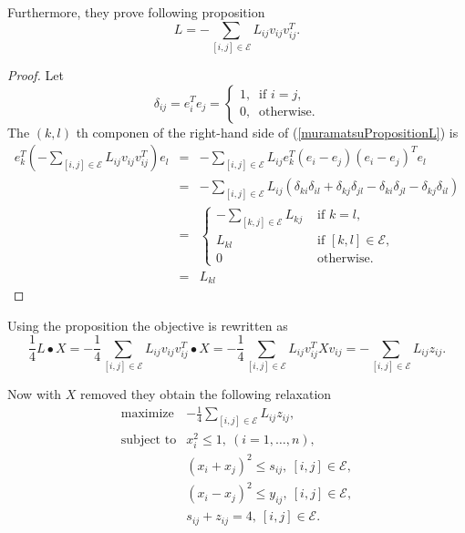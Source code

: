 \documentclass[12pt]{book}
\theoremstyle{definition}
\begin{document}
Furthermore, they prove following proposition
\prop \begin{equation}
\label{muramatsuPropositionL}
L = - \sum_{[i,j]\in \mathcal{E}} L_{ij}v_{ij}v_{ij}^T.
\end{equation}
\rm
\begin{proof}
 Let $$\delta_{ij} = e_i^Te_j = \left\lbrace \begin{array}{l}
1, \ \mbox{ if } i = j, \\
0, \ \mbox{ otherwise}.
\end{array}\right.$$
The $(k,l)$ th componen of the right-hand side of (\ref{muramatsuPropositionL}) is 
\begin{eqnarray*}
e_k^T\left(- \sum_{[i,j]\in \mathcal{E}} L_{ij}v_{ij}v_{ij}^T \right) e_l &=& - \sum_{[i,j]\in \mathcal{E}} L_{ij}e_k^T(e_i-e_j)(e_i-e_j)^Te_l \\
&=& - \sum_{[i,j]\in \mathcal{E}} L_{ij}(\delta_{ki}\delta_{il} + \delta_{kj}\delta_{jl} -  \delta_{ki}\delta_{jl} - \delta_{kj}\delta_{il}) \\
&=& \left\lbrace \begin{array}{ll}
- \sum_{[k,j]\in \mathcal{E}}L_{kj} & \mbox{ if } k = l ,\\
L_{kl} & \mbox{ if } [k,l]\in\mathcal{E}, \\
0 & \mbox{ otherwise.}
\end{array}\right. \\
&=& L_{kl}
\end{eqnarray*}
\end{proof}

Using the proposition the objective is rewritten as 
\begin{equation}
\frac{1}{4}L\bullet X = -\frac{1}{4}\sum_{[i,j]\in \mathcal{E}} L_{ij}v_{ij}v_{ij}^T\bullet X = -\frac{1}{4} \sum_{[i,j]\in \mathcal{E}} L_{ij}v_{ij}^TXv_{ij} = - \sum_{[i,j]\in \mathcal{E}} L_{ij}z_{ij}.
\end{equation}

Now with $X$ removed they obtain the following relaxation 
\begin{equation}
\begin{array}{ll}
\label{MaxCutSOCPRelax2}
\mbox{maximize} & - \frac{1}{4}\sum_{[i,j]\in \mathcal{E}} L_{ij}z_{ij}, \\
\mbox{subject to} & x_i^2\leq 1 , \ (i = 1,\dots ,n),\\
&	(x_i + x_j)^2 \leq s_{ij}, \ [i,j]\in \mathcal{E}, \\
& 	(x_i - x_j)^2 \leq y_{ij}, \ [i,j]\in \mathcal{E}, \\
& s_{ij} + z_{ij} = 4, \ [i,j]\in \mathcal{E}.
\end{array}
\end{equation}
\end{document}
